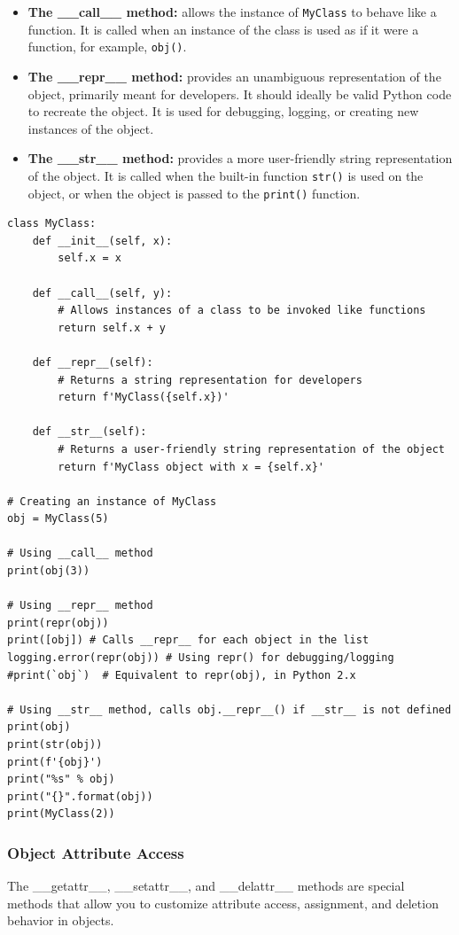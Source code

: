 \begin{itemize}
    \item \textbf{The \_\_call\_\_ method:} allows the instance of \texttt{MyClass} to behave like a function. It is called when an instance of the class is used as if it were a function, for example, \texttt{obj()}.
    \item \textbf{The \_\_repr\_\_ method:} provides an unambiguous representation of the object, primarily meant for developers. It should ideally be valid Python code to recreate the object. It is used for debugging, logging, or creating new instances of the object.
    \item \textbf{The \_\_str\_\_ method:} provides a more user-friendly string representation of the object. It is called when the built-in function \texttt{str()} is used on the object, or when the object is passed to the \texttt{print()} function.
\end{itemize}

\begin{codebox}
\begin{verbatim}
class MyClass:
    def __init__(self, x):
        self.x = x

    def __call__(self, y):
        # Allows instances of a class to be invoked like functions
        return self.x + y

    def __repr__(self):
        # Returns a string representation for developers
        return f'MyClass({self.x})'

    def __str__(self):
        # Returns a user-friendly string representation of the object
        return f'MyClass object with x = {self.x}'

# Creating an instance of MyClass
obj = MyClass(5)

# Using __call__ method
print(obj(3))

# Using __repr__ method
print(repr(obj))
print([obj]) # Calls __repr__ for each object in the list
logging.error(repr(obj)) # Using repr() for debugging/logging
#print(`obj`)  # Equivalent to repr(obj), in Python 2.x

# Using __str__ method, calls obj.__repr__() if __str__ is not defined
print(obj) 
print(str(obj))
print(f'{obj}')
print("%s" % obj)
print("{}".format(obj))
print(MyClass(2))
\end{verbatim}
\end{codebox}

\newpage
\subsubsection{Object Attribute Access}
The \_\_getattr\_\_, \_\_setattr\_\_, and \_\_delattr\_\_ methods are special methods that allow you to customize attribute access, assignment, and deletion behavior in objects.

